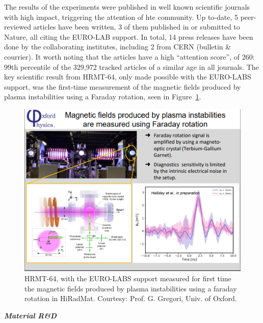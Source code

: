 The results of the experiments were published in well known scientific journals with high impact, triggering the attention of hte community. Up to-date, 5 peer-reviewed articles have been written, 3 of them published in or submitted to Nature, all citing the EURO-LAB support. In total, 14 press releases have been done by the collaborating institutes, including 2 from CERN (bulletin \& courrier). It worth noting that the articles have a high ``attention score'', of 260: 99th percentile of the 329,972 tracked articles of a similar age in all journals. The key scientific result from HRMT-64, only made possible with the EURO-LABS support, was the first-time measurement of the magnetic fields produced by plasma instabilities using a Faraday rotation, seen in Figure~\ref{fig:hiradmat_mag_field_plasma}.
\begin{figure}[H]
    \centering
    \includegraphics[width=0.75\linewidth]{graphics/HRMT_64_magnetic_field.png}
    \caption{HRMT-64, with the EURO-LABS support measured for first time the magnetic fields produced by plasma instabilities using a faraday rotation in HiRadMat. Courtesy: Prof. G. Gregori, Univ. of Oxford.}
    \label{fig:hiradmat_mag_field_plasma}
\end{figure}

\textbf{\textit{Material R\&D}} \mbox{}

